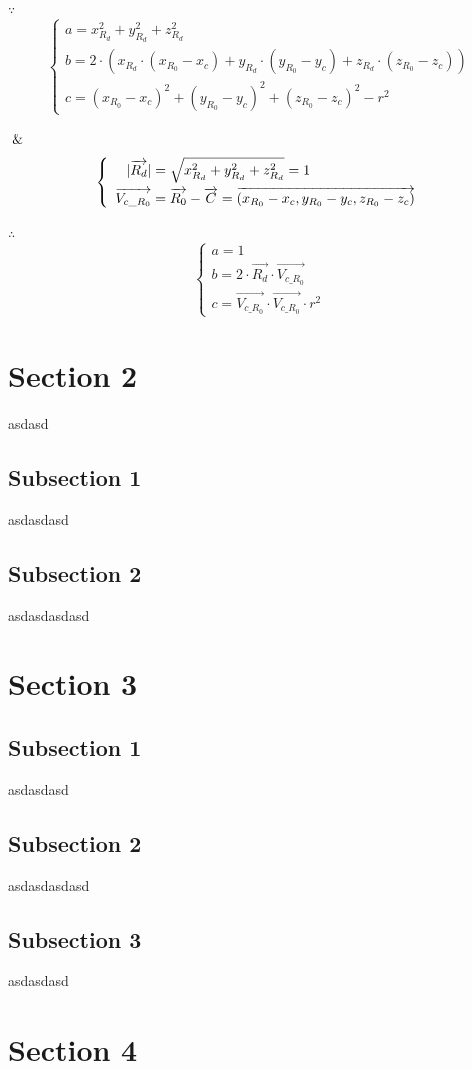 $\because$
\[
\left\{
\begin{array}{lr}
a = x_{R_{d}}^2 + y_{R_{d}}^2 + z_{R_{d}}^2 \\
b = 2 \cdot (x_{R_{d}} \cdot (x_{R_{0}} - x_{c}) + y_{R_{d}} \cdot (y_{R_{0}} - y_{c}) + z_{R_{d}} \cdot (z_{R_{0}} - z_{c})) \\
c = (x_{R_{0}} - x_{c})^2 + (y_{R_{0}} - y_{c})^2 + (z_{R_{0}} - z_{c})^2 - r^2
\end{array}
\right.
\]

$\And$
\[
\left\{
\begin{array}{lr}
\begin{aligned}
\lvert \overrightarrow{R_{d}} \rvert &= \sqrt{x_{R_{d}}^2 + y_{R_{d}}^2 + z_{R_{d}}^2} = 1 \\
\overrightarrow{V_{c\_R_{0}}} &= \overrightarrow{R_{0}} - \overrightarrow{C} = \overrightarrow{(x_{R_{0}} - x_{c}, y_{R_{0}} - y_{c}, z_{R_{0}} - z_{c})}
\end{aligned}
\end{array}
\right.
\]

$\therefore$
\[
\left\{
\begin{array}{lr}
a =1 \\
b = 2 \cdot \overrightarrow{R_{d}} \cdot \overrightarrow{V_{c\_R_{0}}} \\
c = \overrightarrow{V_{c\_R_{0}}} \cdot \overrightarrow{V_{c\_R_{0}}} \cdot r^2
\end{array}
\right.
\]



\section{Section 2}
asdasd

\subsection{Subsection 1}
asdasdasd

\subsection{Subsection 2}
asdasdasdasd

\section{Section 3}

\subsection{Subsection 1}
asdasdasd

\subsection{Subsection 2}
asdasdasdasd

\subsection{Subsection 3}
asdasdasd

\section{Section 4}

